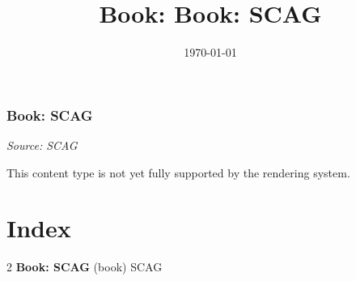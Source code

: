 \documentclass[10pt,letterpaper]{book}
\title{Book: Book: SCAG}
{}
{}
\date{\today}
\begin{document}
\maketitle
\thispagestyle{empty}
\clearpage


\subsection{Book: SCAG}
\textit{Source: SCAG}

This content type is not yet fully supported by the rendering system.


\chapter*{Index}

\begin{multicols}{2}
{}
\textbf{Book: SCAG} (book) \dotfill SCAG \\
{}
\end{multicols}
\end{document}
